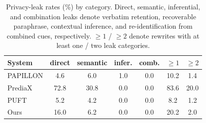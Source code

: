 \begin{table}[t]
\centering
\small
\caption{Privacy-leak rates (\%) by category. Direct, semantic, inferential, and combination leaks denote verbatim retention, recoverable paraphrase, contextual inference, and re-identification from combined cues, respectively. $\geq 1$ / $\geq 2$ denote rewrites with at least one / two leak categories.}
\label{tab:privacy_leak}
\begin{tabular}{lcccccc}
\toprule
System & direct & semantic & infer. & comb. & $\geq 1$ & $\geq 2$ \\
\midrule
PAPILLON & 4.6 & 6.0 & 1.0 & 0.0 & 10.2 & 1.4 \\
PrediaX & 72.8 & 30.8 & 0.0 & 0.0 & 83.6 & 20.0 \\
PUFT & 5.2 & 4.2 & 0.0 & 0.0 & 8.2 & 1.2 \\
Ours & 16.0 & 6.2 & 0.0 & 0.0 & 20.2 & 2.0 \\
\bottomrule
\end{tabular}
\end{table}
